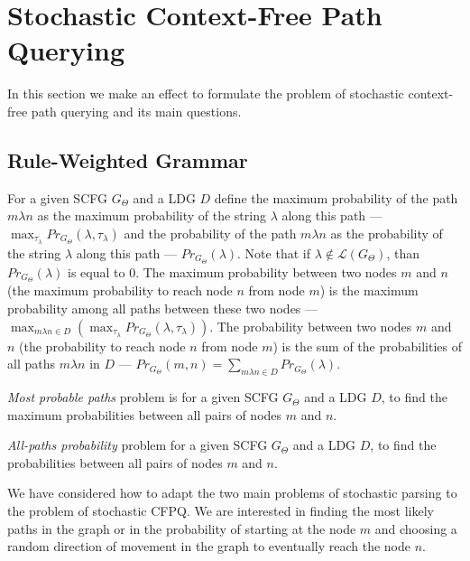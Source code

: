 \documentclass[sigconf, 10pt]{acmart}
\begin{document}

\section{Stochastic Context-Free Path Querying}

In this section we make an effect to formulate the problem of stochastic context-free path querying and its main questions.

\subsection{Rule-Weighted Grammar}

For a given SCFG $G_\Theta$ and a LDG $D$ define the maximum probability of the path $m \lambda n$ as the maximum probability of the string $\lambda$ along this path --- $\max_{\tau_\lambda} Pr_{G_\Theta}(\lambda, \tau_\lambda)$ and the probability of the path $m \lambda n$ as the probability of the string $\lambda$ along this path --- $Pr_{G_\Theta}(\lambda)$. 
Note that if $\lambda \notin \mathcal{L}(G_\Theta)$, than $Pr_{G_\Theta}(\lambda)$ is equal to 0.
The maximum probability between two nodes $m$ and $n$ (the maximum probability to reach node $n$ from node $m$) is the maximum probability among all paths between these two nodes --- $ \max_{m \lambda n \in D} (\max_{\tau_\lambda} Pr_{G_\Theta}(\lambda, \tau_\lambda))$.
The probability between two nodes $m$ and $n$ (the probability to reach node $n$ from node $m$) is the sum of the probabilities of all paths $m \lambda n$ in $D$ --- $Pr_{G_\Theta}(m, n) = \sum_{m \lambda n \in D} Pr_{G_\Theta}(\lambda)$.


\emph{Most probable paths} problem is for a given SCFG $G_\Theta$ and a LDG $D$, to find the maximum probabilities between all pairs of nodes $m$ and $n$. 

\emph{All-paths probability} problem for a given SCFG $G_\Theta$ and a LDG $D$, to find the probabilities between all pairs of nodes $m$ and $n$.

We have considered how to adapt the two main problems of stochastic parsing to the problem of stochastic CFPQ. 
We are interested in finding the most likely paths in the graph or in the probability of starting at the node $m$ and choosing a random direction of movement in the graph to eventually reach the node $n$.
\end{document}
